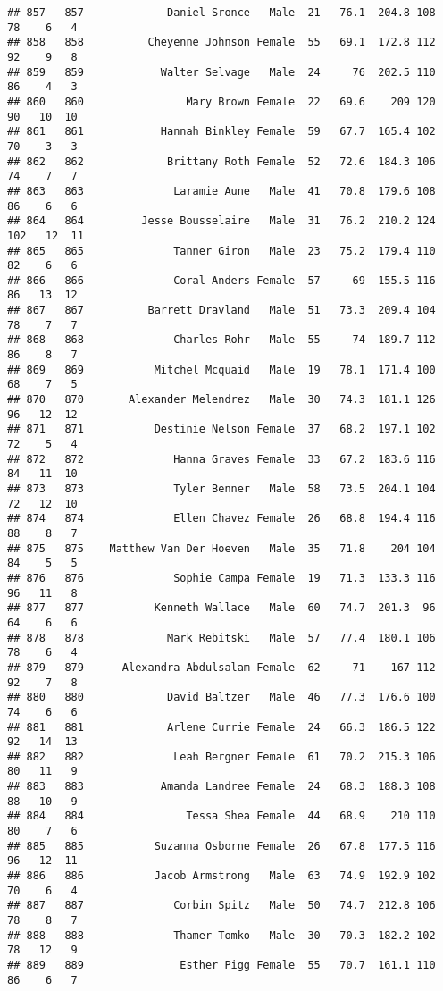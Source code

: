 \documentclass[
]{article}
\begin{document}
\begin{verbatim}
## 857   857             Daniel Sronce   Male  21   76.1  204.8 108  78    6   4
## 858   858          Cheyenne Johnson Female  55   69.1  172.8 112  92    9   8
## 859   859            Walter Selvage   Male  24     76  202.5 110  86    4   3
## 860   860                Mary Brown Female  22   69.6    209 120  90   10  10
## 861   861            Hannah Binkley Female  59   67.7  165.4 102  70    3   3
## 862   862             Brittany Roth Female  52   72.6  184.3 106  74    7   7
## 863   863              Laramie Aune   Male  41   70.8  179.6 108  86    6   6
## 864   864         Jesse Bousselaire   Male  31   76.2  210.2 124 102   12  11
## 865   865              Tanner Giron   Male  23   75.2  179.4 110  82    6   6
## 866   866              Coral Anders Female  57     69  155.5 116  86   13  12
## 867   867          Barrett Dravland   Male  51   73.3  209.4 104  78    7   7
## 868   868              Charles Rohr   Male  55     74  189.7 112  86    8   7
## 869   869           Mitchel Mcquaid   Male  19   78.1  171.4 100  68    7   5
## 870   870       Alexander Melendrez   Male  30   74.3  181.1 126  96   12  12
## 871   871           Destinie Nelson Female  37   68.2  197.1 102  72    5   4
## 872   872              Hanna Graves Female  33   67.2  183.6 116  84   11  10
## 873   873              Tyler Benner   Male  58   73.5  204.1 104  72   12  10
## 874   874              Ellen Chavez Female  26   68.8  194.4 116  88    8   7
## 875   875    Matthew Van Der Hoeven   Male  35   71.8    204 104  84    5   5
## 876   876              Sophie Campa Female  19   71.3  133.3 116  96   11   8
## 877   877           Kenneth Wallace   Male  60   74.7  201.3  96  64    6   6
## 878   878             Mark Rebitski   Male  57   77.4  180.1 106  78    6   4
## 879   879      Alexandra Abdulsalam Female  62     71    167 112  92    7   8
## 880   880             David Baltzer   Male  46   77.3  176.6 100  74    6   6
## 881   881             Arlene Currie Female  24   66.3  186.5 122  92   14  13
## 882   882              Leah Bergner Female  61   70.2  215.3 106  80   11   9
## 883   883            Amanda Landree Female  24   68.3  188.3 108  88   10   9
## 884   884                Tessa Shea Female  44   68.9    210 110  80    7   6
## 885   885           Suzanna Osborne Female  26   67.8  177.5 116  96   12  11
## 886   886           Jacob Armstrong   Male  63   74.9  192.9 102  70    6   4
## 887   887              Corbin Spitz   Male  50   74.7  212.8 106  78    8   7
## 888   888              Thamer Tomko   Male  30   70.3  182.2 102  78   12   9
## 889   889               Esther Pigg Female  55   70.7  161.1 110  86    6   7

\end{verbatim}
\end{document}
